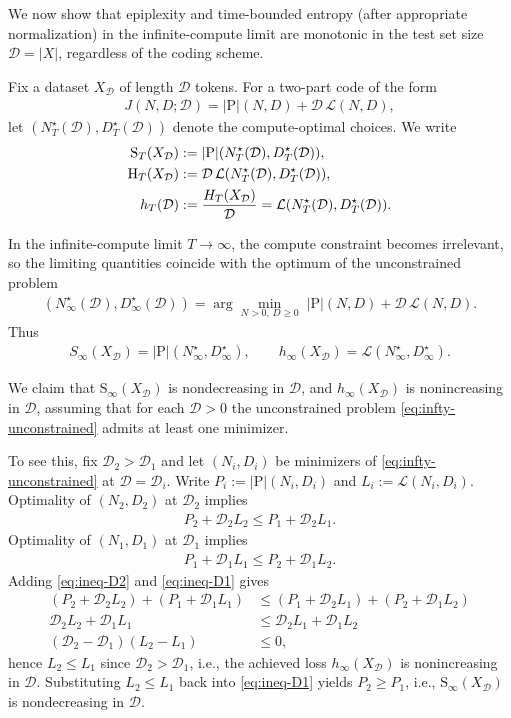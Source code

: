 \documentclass[twoside]{article}
\renewcommand{\L}{\mathcal{L}}
\newcommand{\D}{\mathcal{D}}
\newcommand{\rH}{\mathrm{H}}
\newcommand{\rS}{\mathrm{S}}
\renewcommand{\L}{\mathcal{L}}
\begin{document}
We now show that epiplexity and time-bounded entropy (after appropriate normalization) in the infinite-compute limit are monotonic in the test set size $\D = |X|$, regardless of the coding scheme.

Fix a dataset $X_{\D}$ of length $\D$ tokens. For a two-part code of the form
\begin{align}
    J(N, D; \D) = |\mathrm{P}|(N, D) + \D\, \L(N, D),
    \label{eq:J-P-plus-DL}
\end{align}
let $(N^\star_T(\D), D^\star_T(\D))$ denote the compute-optimal choices. We write
\begin{align}
    \rS_T(X_{\D}) &:= |\mathrm{P}|\qty(N^\star_T(\D), D^\star_T(\D)), \\
    \rH_T(X_{\D}) &:= \D\, \L\qty(N^\star_T(\D), D^\star_T(\D)), \\
    h_T(\D) &:= \frac{H_T(X_{\D})}{\D} = \L\qty(N^\star_T(\D), D^\star_T(\D)).
\end{align}

In the infinite-compute limit $T \to \infty$, the compute constraint becomes irrelevant, so the limiting quantities coincide with the optimum of the unconstrained problem
\begin{align}
    (N_\infty^\star(\D), D_\infty^\star(\D)) = \arg\min_{N > 0,\, D \ge 0}\; |\mathrm{P}|(N, D) + \D\, \L(N, D).
    \label{eq:infty-unconstrained}
\end{align}
Thus
\begin{align}
    S_\infty(X_{\D}) = |\mathrm{P}|(N_\infty^\star, D_\infty^\star), \qquad h_\infty(X_\D) = \L(N_\infty^\star, D_\infty^\star).
\end{align}

We claim that $\rS_\infty(X_{\D})$ is nondecreasing in $\D$, and $h_\infty(X_\D)$ is nonincreasing in $\D$, assuming that for each $\D > 0$ the unconstrained problem \eqref{eq:infty-unconstrained} admits at least one minimizer.

To see this, fix $\D_2 > \D_1$ and let $(N_i, D_i)$ be minimizers of \eqref{eq:infty-unconstrained} at $\D = \D_i$. Write $P_i := |\mathrm{P}|(N_i, D_i)$ and $L_i := \L(N_i, D_i)$. Optimality of $(N_2, D_2)$ at $\D_2$ implies
\begin{align}
    P_2 + \D_2 L_2 \le P_1 + \D_2 L_1.
    \label{eq:ineq-D2}
\end{align}
Optimality of $(N_1, D_1)$ at $\D_1$ implies
\begin{align}
    P_1 + \D_1 L_1 \le P_2 + \D_1 L_2.
    \label{eq:ineq-D1}
\end{align}
Adding \eqref{eq:ineq-D2} and \eqref{eq:ineq-D1} gives
\begin{align}
    (P_2 + \D_2 L_2) + (P_1 + \D_1 L_1) &\le (P_1 + \D_2 L_1) + (P_2 + \D_1 L_2) \nonumber\\
    \D_2 L_2 + \D_1 L_1 &\le \D_2 L_1 + \D_1 L_2 \nonumber\\
    (\D_2 - \D_1)(L_2 - L_1) &\le 0,
\end{align}
hence $L_2 \le L_1$ since $\D_2 > \D_1$, i.e., the achieved loss $h_\infty(X_\D)$ is nonincreasing in $\D$. Substituting $L_2 \le L_1$ back into \eqref{eq:ineq-D1} yields $P_2 \ge P_1$, i.e., $\rS_\infty(X_{\D})$ is nondecreasing in $\D$.
\end{document}
